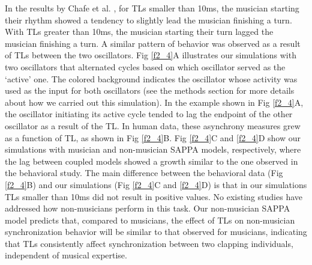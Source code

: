 \documentclass{report}
\begin{document}
In the results by Chafe et al. \cite{chafe2010effect}, for TLs smaller than 10ms, the musician starting their rhythm showed a tendency to slightly lead the musician finishing a turn. With TLs greater than 10ms, the musician starting their turn lagged the musician finishing a turn. A similar pattern of behavior was observed as a result of TLs between the two oscillators. Fig \ref{f2_4}A illustrates our simulations with two oscillators that alternated cycles based on which oscillator served as the ‘active’ one. The colored background indicates the oscillator whose activity was used as the input for both oscillators (see the methods section for more details about how we carried out this simulation). In the example shown in Fig \ref{f2_4}A, the oscillator initiating its active cycle tended to lag the endpoint of the other oscillator as a result of the TL. In human data, these asynchrony measures grew as a function of TL, as shown in Fig \ref{f2_4}B. Fig \ref{f2_4}C and \ref{f2_4}D show our simulations with musician and non-musician SAPPA models, respectively, where the lag between coupled models showed a growth similar to the one observed in the behavioral study. The main difference between the behavioral data (Fig \ref{f2_4}B) and our simulations (Fig \ref{f2_4}C and \ref{f2_4}D) is that in our simulations TLs smaller than 10ms did not result in positive values. No existing studies have addressed how non-musicians perform in this task. Our non-musician SAPPA model predicts that, compared to musicians, the effect of TLs on non-musician synchronization behavior will be similar to that observed for musicians, indicating that TLs consistently affect synchronization between two clapping individuals, independent of musical expertise.
\end{document}
